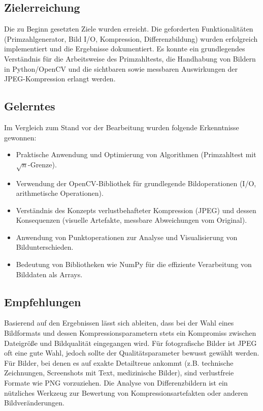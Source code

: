 \documentclass[11pt, a4paper]{article}
\begin{document}
\subsection{Zielerreichung}
Die zu Beginn gesetzten Ziele wurden erreicht. Die geforderten Funktionalitäten (Primzahlgenerator, Bild I/O, Kompression, Differenzbildung) wurden erfolgreich implementiert und die Ergebnisse dokumentiert. Es konnte ein grundlegendes Verständnis für die Arbeitsweise des Primzahltests, die Handhabung von Bildern in Python/OpenCV und die sichtbaren sowie messbaren Auswirkungen der JPEG-Kompression erlangt werden.

\subsection{Gelerntes}
Im Vergleich zum Stand vor der Bearbeitung wurden folgende Erkenntnisse gewonnen:
\begin{itemize}
    \item Praktische Anwendung und Optimierung von Algorithmen (Primzahltest mit $\sqrt{n}$-Grenze).
    \item Verwendung der OpenCV-Bibliothek für grundlegende Bildoperationen (I/O, arithmetische Operationen).
    \item Verständnis des Konzepts verlustbehafteter Kompression (JPEG) und dessen Konsequenzen (visuelle Artefakte, messbare Abweichungen vom Original).
    \item Anwendung von Punktoperationen zur Analyse und Visualisierung von Bildunterschieden.
    \item Bedeutung von Bibliotheken wie NumPy für die effiziente Verarbeitung von Bilddaten als Arrays.
\end{itemize}

\subsection{Empfehlungen}
Basierend auf den Ergebnissen lässt sich ableiten, dass bei der Wahl eines Bildformats und dessen Kompressionsparametern stets ein Kompromiss zwischen Dateigröße und Bildqualität eingegangen wird. Für fotografische Bilder ist JPEG oft eine gute Wahl, jedoch sollte der Qualitätsparameter bewusst gewählt werden. Für Bilder, bei denen es auf exakte Detailtreue ankommt (z.B. technische Zeichnungen, Screenshots mit Text, medizinische Bilder), sind verlustfreie Formate wie PNG vorzuziehen. Die Analyse von Differenzbildern ist ein nützliches Werkzeug zur Bewertung von Kompressionsartefakten oder anderen Bildveränderungen.
\end{document}
